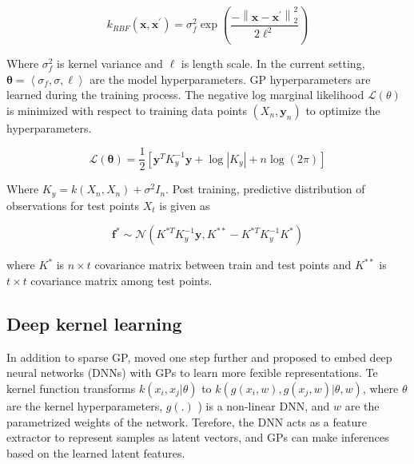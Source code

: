 \documentclass[a4paper, nobind]{templates/cdethesis}
\begin{document}
\begin{equation}
k_{RBF}\left(\mathbf{x}, \mathbf{x}^{\prime}\right) = 
        \sigma_{f}^{2} 
        \exp \left(
                \frac{
                        -\left\|\mathbf{x}-\mathbf{x}^{\prime}\right\|_{2}^{2}
                }{
                        2 \ell^{2}
                }\right
             ) \label{eq:7}
\end{equation}

Where \(\sigma_{f}^{2}\) is kernel variance and \(\ell\) is length scale. In the current setting, \(\boldsymbol{\theta}=\left\langle\sigma_{f}, \sigma, \ell\right\rangle\) are the model hyperparameters. GP hyperparameters are learned during the training process. The negative log marginal likelihood \(\mathcal{L}(\theta)\) is minimized with respect to training data points \(\left(X_{n}, \mathbf{y}_{n}\right)\) to optimize the hyperparameters.

\begin{equation}
\mathcal{L}(\boldsymbol{\theta}) = \frac{1}{2}\left
    [
        \mathbf{y}^{T} K_{y}^{-1} \mathbf{y} +
        \log \left|K_{y}\right| +
        n\log(2\pi)\right
    ] \label{eq:8}
\end{equation}

Where \(K_{y}=k\left(X_{n}, X_{n}\right)+\sigma^{2} I_{n}\). Post training, predictive distribution of observations for test points \(X_{t}\) is given as

\begin{equation}
\mathbf{f}^{*} \sim \mathcal{N}\left(
    K^{* T} K_{y}^{-1} \mathbf{y}, K^{* *}-K^{* T} K_{y}^{-1} K^{*}
    \right
) \label{eq:9}
\end{equation}

where \(K^{*}\) is \(n \times t\) covariance matrix between train and test points and \(K^{* *}\) is \(t \times t\) covariance matrix among test points.

\hypertarget{deep-kernel-learning}{%
\subsection{Deep kernel learning}\label{deep-kernel-learning}}

In addition to sparse GP, moved one step further and proposed to embed deep
neural networks (DNNs) with GPs to learn more fexible representations. Te kernel
function transforms \(k(x_i, x_j|\theta)\) to \(k(g(x_i,w), g(x_j,w)|\theta, w)\),
where \(\theta\) are the kernel hyperparameters, \(g(.)\) ) is a non-linear DNN,
and \(w\) are the parametrized weights of the network. Terefore, the DNN acts as
a feature extractor to represent samples as latent vectors, and GPs can make
inferences based on the learned latent features.
\end{document}
